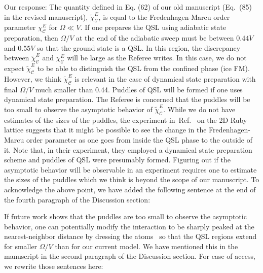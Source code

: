 \documentclass[
onecolumn,
superscriptaddress,
longbibliography,
nofootinbib,
 amsmath,amssymb,
 aps,
prb
]{revtex4-2}
\newcommand{\response}[1]{\textcolor{Mulberry}{#1}}
\newcommand{\wesay}[1]{
	\begin{leftborder}
		\color{BrickRed}{#1}
	\end{leftborder}
}
\begin{document}
\begin{enumerate}
\response{Our response: The quantity defined in Eq. (62) of our old manuscript (Eq.~(85) in the revised manuscript), $\tilde{\chi}_{\mathcal{C}}^E$, is equal to the Fredenhagen-Marcu order parameter $\chi_{\mathcal{C}}^E$ for $\Omega \ll V$.
If one prepares the QSL using adiabatic state preparation, then $\Omega/V$ at the end of the adiabatic sweep must be between $0.44V$ and $0.55V$ so that the ground state is a QSL.
In this region, the discrepancy between $\tilde{\chi}_{\mathcal{C}}^E$ and $\chi_{\mathcal{C}}^E$ will be large as the Referee writes. 
In this case, we do not expect $\tilde{\chi}_{\mathcal{C}}^E$ to be able to distinguish the QSL from the confined phase (ice FM). 
However, we think $\tilde{\chi}_{\mathcal{C}}^E$ is relevant in the case of dynamical state preparation with final $\Omega/V$ much smaller than 0.44. %
Puddles of QSL will be formed if one uses dynamical state preparation.
The Referee is concerned that the puddles will be too small to observe the asymptotic behavior of $\tilde{\chi}^E_{\mathcal{C}}$. 
While we do not have estimates of the sizes of the puddles, the experiment in~Ref.~\cite{semeghini2021} on the 2D Ruby lattice suggests that it might be possible to see the change in the Fredenhagen-Marcu order parameter as one goes from inside the QSL phase to the outside of it. 
Note that, in their experiment, they employed a dynamical state preparation scheme and puddles of QSL were presumably formed.
Figuring out if the asymptotic behavior will be observable in an experiment requires one to estimate the sizes of the puddles which we think is beyond the scope of our manuscript.
To acknowledge the above point, we have added the following sentence at the end of the fourth paragraph of the Discussion section:}
\wesay{One must also estimate the size of the puddles of the QSL and compare them to the length scale at which the asymptotic behavior of the correlators is observed. We leave this for future work.}
\response{If future work shows that the puddles are too small to observe the asymptotic behavior, one can potentially modify the interaction to be sharply peaked at the nearest-neighbor distance by dressing the atoms~\cite{steinert2023spatially, hollerith2022realizing} so that the QSL regions extend for smaller $\Omega/V$ than for our current model. We have mentioned this in the manuscript in the second paragraph of the Discussion section. For ease of access, we rewrite those sentences here:
}
\end{enumerate}
\end{document}
